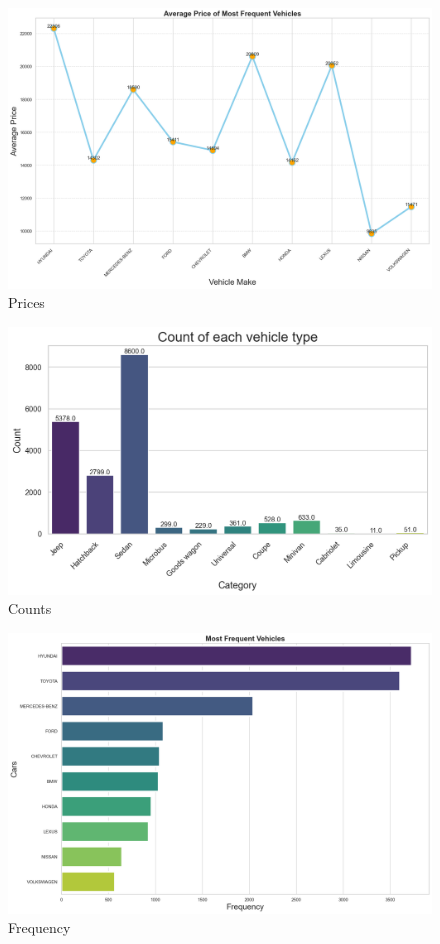 \documentclass[paper=a4, fontsize=11pt,twoside]{scrartcl}
\begin{document}
\begin{figure}[h!]
\includegraphics[width=\textwidth]{price.png}
\caption{\label{fig:your-figure}Prices}
\end{figure}


\begin{figure}[h!]
\includegraphics[width=\textwidth]{count.png}
\caption{\label{fig:your-figure}Counts}
\end{figure}


\begin{figure}[h!]
\includegraphics[width=\textwidth]{frequent.png}
\caption{\label{fig:your-figure}Frequency}
\end{figure}
\end{document}

